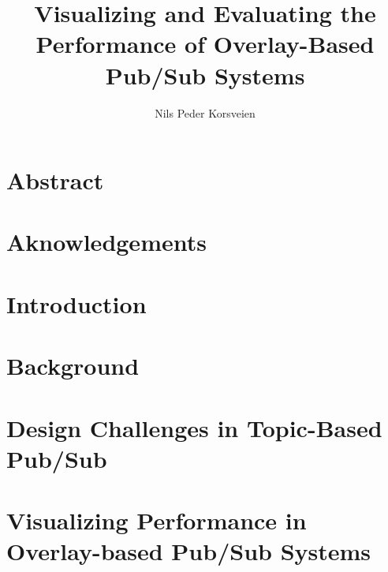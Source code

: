 \documentclass[UKenglish, a4paper]{ifimaster}
\title{Visualizing and Evaluating the Performance of Overlay-Based Pub/Sub Systems}
\subtitle{}
\author{Nils Peder Korsveien}
\begin{document}
\ififorside{}
\frontmatter{}
\maketitle{}

\chapter*{Abstract}
\tableofcontents{}
\listoffigures{}
\listoftables{}
\chapter*{Aknowledgements}
\mainmatter{}

\chapter{Introduction}


\chapter{Background}
\label{ch:background}


\chapter{Design Challenges in Topic-Based Pub/Sub}
\label{ch:design-challenges}


\chapter{Visualizing Performance in Overlay-based Pub/Sub Systems}
\label{ch:vizpub}

\end{document}
